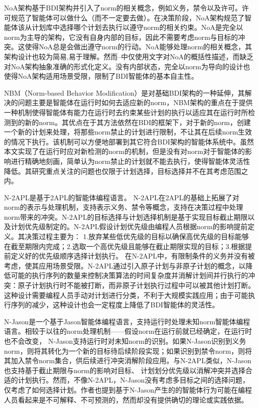 NoA\cite{DBLP:conf/ijcai/KollingbaumN03}架构基于BDI架构并引入了norm的相关概念，例如义务，禁令以及许可。许可规范了智能体可以做什么（而不一定要去做）。在决策阶段，NoA架构规范了智能体该从计划库中选择哪个计划去执行以遵守norm的相关约束。NoA是完全以norm为主导的架构，它没有自身内部的目标，因此不需要考虑norm与目标的冲突。这使得NoA总是会做出遵守norm的行动。NoA能够处理norm的相关概念，其架构设计也较为简易,易于理解。然而--中仅使用文字对NoA的概括性描述，而缺乏对NoA架构抽象准确的形式化定义。没有内部状态，完全以norm为导向的设计也使得NoA架构适用场景受限，限制了BDI智能体的基本自主性。


NBM（Norm-based Behavior Modification）\cite{DBLP:conf/atal/MeneguzziL09}是对基础BDI架构的一种延伸，其解决的问题主要是智能体在运行时如何去适应新的norm，NBM架构的重点在于提供一种机制使得智能体有能力在运行时去约束某些计划的执行以适应其在运行时所检测到的新的norm。其优点在于其方法依然在BDI的框架下，对于新的norm，创建一个新的计划来处理，将那些norm禁止的计划进行限制，不让其在后续norm生效的情况下执行。该机制可以方便地部署到其它符合BDI架构的智能体系统中。虽然本文实现了在运行时应对新检测的norm的机制，但是没有对norm对于智能体的影响进行精确地刻画，简单认为norm禁止的计划就不能去执行，使得智能体灵活性降低。其研究重点关注的问题也仅限于计划选择，目标选择并不在其考虑范围之内。

N-2APL\cite{DBLP:conf/aamas/AlechinaDL12}是基于2APL\cite{DBLP:journals/aamas/Dastani08}的智能体编程语言。 N-2APL在2APL的基础上拓展了对norm的表示与处理机制，支持表示义务、禁令等概念，支持在决策过程中处理norm带来的冲突。N-2APL的目标选择与计划选择机制是基于实现目标截止期限以及计划优先级制定的。N-2APL假设计划优先级由编程人员根据norm的影响提前定义。其决策过程主要为： 1.放弃某些低优先级的目标以确保高优先级的目标能够在截至期限内完成；2.选取一个高优先级且能够在截止期限实现的目标；3.根据提前定义好的优先级顺序选择计划执行。
在N-2APL中，有限制条件的义务并没有被考虑，使其应用场景受限。N-2APL通过引入原子计划与非原子计划的概念，以降低可能的执行序列的数量来控制决策算法的时间复杂度并消解计划间并行执行的冲突：原子计划执行时不能被打断，而非原子计划执行过程中可以被其他计划打断。这种设计需要编程人员手动对计划进行分类，不利于大规模实践应用；由于可能执行序列的减少，这种设计也会一定程度上降低了BDI智能体的灵活性。

N-Jason\cite{DBLP:conf/dalt/LeePLDA14}是一个基于Jason\cite{bordini2007programming}智能体编程语言，支持运行时处理未知norm智能体编程语言。相较于以往的norm处理机制——假设norm在运行前就已经确定，在运行时也不会改变， N-Jason支持运行时对未知norm的识别。如果N-Jason识别到义务norm，则将其转化为一个新的目标待后续阶段实现；如果识别到禁令norm，则将其加入禁令norm集合，供后续进行冲突消解阶段应用。与N-2APL类似，N-Jason 也支持基于截止期限与norm的影响对目标、 计划划分优先级以消解冲突并选择合适的计划执行。然而，不像N-2APL，N-Jason没有考虑多目标之间的选择问题，仅考虑了如何选择计划。作者也提到基于N-Jason产生的的智能体行为可能在编程人员看起来是不可解释、不可预测的，然而却没有提供确切的理论或实践依据。

